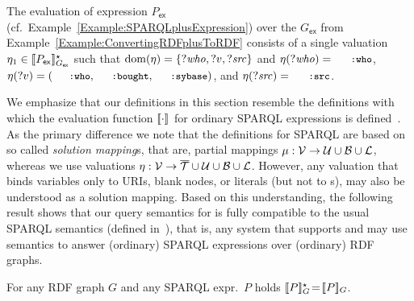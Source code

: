 \begin{example} \label{Example:SPARQLplusEvaluation}
	The evaluation of {\SPARQLplus} expression $P_\mathsf{ex}$ (cf.~Example~\ref{Example:SPARQLplusExpression}) over the {\RDFplusGraph} $G_\mathsf{ex}$ from Example~\ref{Example:ConvertingRDFplusToRDF} consists of a single valuation
		$\eta_1 \in [\![P_\mathsf{ex}]\!]^\star_{G_\mathsf{ex}}$
	such that $\mathrm{dom}(\eta) = \lbrace ?\mathit{who}, ?v, ?\mathit{src} \rbrace$ and $\eta(?\mathit{who})=\mathTinyRDF{:who}$, $\eta(?v)=(\mathTinyRDF{:who},\mathTinyRDF{:bought},\mathTinyRDF{:sybase})$, and $\eta(?\mathit{src})=\mathTinyRDF{:src}$.
\end{example}

\noindent
% 
We emphasize that our definitions in this section resemble the definitions with which
the evaluation function $[\![\cdot]\!]_{ }$ for ordinary SPARQL
	expressions is defined~\cite{Perez09:SemanticsAndComplexityOfSPARQL}.
As the primary difference we note that the definitions for SPARQL are based on so called \emph{solution mapping}s, that are, partial mappings $\mu : \mathcal{V} \rightarrow \mathcal{U} \cup \mathcal{B} \cup \mathcal{L}$, whereas we use valuations $\eta : \mathcal{V} \rightarrow \overline{\mathcal{T}} \cup \mathcal{U} \cup \mathcal{B} \cup \mathcal{L}$. However, any valuation
	that binds variables only to URIs, blank nodes, or literals (but not to {\RDFplusTriple}s),
may also be understood as a solution mapping. Based on this understanding, the following result shows that our query semantics for {\SPARQLplus} is fully compatible to the usual SPARQL semantics (defined in~\cite{Perez09:SemanticsAndComplexityOfSPARQL}), that is, any system that supports {\RDFplus} and {\SPARQLplus} may use {\SPARQLplus} semantics to answer (ordinary) SPARQL expressions over (ordinary) RDF graphs.

\begin{proposition} \label{Proposition:EquivalenceOfSemantics}
	For any
	RDF graph $G$ and any
	SPARQL
		expr.~$P$
	holds $[\![P]\!]^\star_{G} \!=\! [\![P]\!]_{G}$.
\end{proposition}

